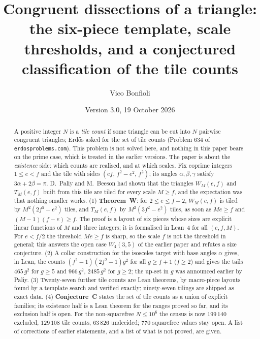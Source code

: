 \documentclass[11pt,reqno]{amsart}
\title[Thresholds and a classification conjecture]{Congruent dissections of a triangle:\\ the six-piece template, scale thresholds, and a conjectured classification of the tile counts}
\author{Vico Bonfioli}
\date{Version 3.0, 19 October 2026}
\theoremstyle{plain}
\theoremstyle{definition}
\begin{document}
\begin{abstract}
A positive integer $N$ is a \emph{tile count} if some triangle can be cut into $N$ pairwise congruent triangles; Erd\H{o}s asked for the set of tile counts (Problem 634 of \texttt{erdosproblems.com}).
This problem is not solved here, and nothing in this paper bears on the prime case, which is treated in the earlier versions.
The paper is about the \emph{existence} side: which counts are realised, and at which scales.
Fix coprime integers $1\le e<f$ and the tile with sides $(ef,\,f^2-e^2,\,f^2)$; its angles $\alpha,\beta,\gamma$ satisfy $3\alpha+2\beta=\pi$.
D.~Paliy and M.~Beeson had shown that the triangles $W_M(e,f)$ and $T_M(e,f)$ built from this tile are tiled for every scale $M\ge f$, and the expectation was that nothing smaller works.
(1) \textbf{Theorem~W}: for $2\le e\le f-2$, $W_M(e,f)$ is tiled by $M^2(2f^2-e^2)$ tiles, and $T_M(e,f)$ by $M^2(3f^2-e^2)$ tiles, as soon as $Me\ge f$ and $(M-1)(f-e)\ge f$.
The proof is a layout of six pieces whose sizes are explicit linear functions of $M$ and three integers; it is formalised in Lean~4 for all $(e,f,M)$.
For $e<f/2$ the threshold $Me\ge f$ is sharp, so the scale $f$ is not the threshold in general; this answers the open case $W_4(3,5)$ of the earlier paper and refutes a size conjecture.
(2) A collar construction for the isosceles target with base angles $\alpha$ gives, in Lean, the counts $(f^2-1)(2f^2-1)g^2$ for all $g\ge f+1$ ($f\ge2$) and gives the tails $465\,g^2$ for $g\ge5$ and $966\,g^2$, $2485\,g^2$ for $g\ge2$; the up-set in $g$ was announced earlier by Paliy.
(3) Twenty-seven further tile counts are Lean theorems, by macro-piece layouts found by a template search and verified exactly; ninety-seven tilings are shipped as exact data.
(4) \textbf{Conjecture~C} states the set of tile counts as a union of explicit families; its existence half is a Lean theorem for the ranges proved so far, and its exclusion half is open.
For the non-squarefree $N\le10^6$ the census is now $199\,140$ excluded, $129\,108$ tile counts, $63\,826$ undecided; $770$ squarefree values stay open.
A list of corrections of earlier statements, and a list of what is not proved, are given.
\end{abstract}
\maketitle

\end{document}
